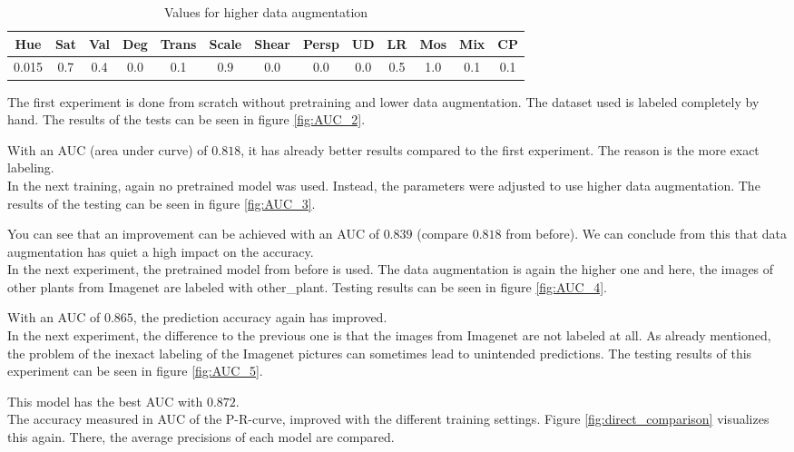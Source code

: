 \begin{table}[h!]
	\centering
	\begin{tabular}{|c c c c c c c c c c c c c|} 
		\hline
		Hue & Sat & Val & Deg & Trans & Scale & Shear & Persp & UD & LR & Mos & Mix & CP\\ %
		\hline
		0.015 & 0.7 & 0.4 & 0.0 & 0.1 & 0.9 & 0.0 & 0.0 & 0.0 & 0.5 & 1.0 & 0.1 & 0.1\\
		\hline
	\end{tabular}
	\caption{Values for higher data augmentation}
	\label{tab:high_augmentation}
\end{table}

The first experiment is done from scratch without pretraining and lower data augmentation. The dataset used is labeled completely by hand. The results of the tests can be seen in figure \ref{fig:AUC_2}.


With an AUC (area under curve) of $ 0.818 $, it has already better results compared to the first experiment. The reason is the more exact labeling. \\

In the next training, again no pretrained model was used. Instead, the parameters were adjusted to use higher data augmentation. The results of the testing can be seen in figure \ref{fig:AUC_3}.


You can see that an improvement can be achieved with an AUC of $ 0.839 $ (compare $ 0.818 $ from before). We can conclude from this that data augmentation has quiet a high impact on the accuracy. \\

In the next experiment, the pretrained model from before is used. The data augmentation is again the higher one and here, the images of other plants from Imagenet are labeled with other\_plant. Testing results can be seen in figure \ref{fig:AUC_4}.

With an AUC of $ 0.865 $, the prediction accuracy again has improved. \\

In the next experiment, the difference to the previous one is that the images from Imagenet are not labeled at all. As already mentioned, the problem of the inexact labeling of the Imagenet pictures can sometimes lead to unintended predictions. The testing results of this experiment can be seen in figure \ref{fig:AUC_5}.

This model has the best AUC with $ 0.872 $.\\


The accuracy measured in AUC of the P-R-curve, improved with the different training settings. Figure \ref{fig:direct_comparison} visualizes this again. There, the average precisions of each model are compared. 

